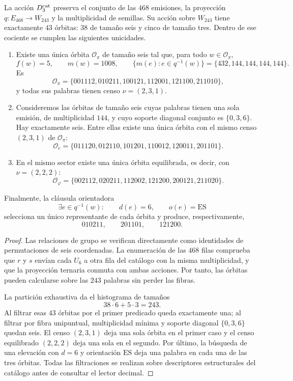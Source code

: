 \begin{theorem}
\label{thm:selector-orbital-constantes}
La acción \(D_3^{\rm cat}\) preserva el conjunto de las \(468\) emisiones,
la proyección \(q:E_{468}\to W_{243}\) y la multiplicidad de semillas. Su
acción sobre \(W_{243}\) tiene exactamente \(43\) órbitas: \(38\) de tamaño
seis y cinco de tamaño tres. Dentro de ese cociente se cumplen las siguientes
unicidades.

\begin{enumerate}
\item Existe una única órbita \(\mathcal O_\pi\) de tamaño seis tal que, para
todo \(w\in\mathcal O_\pi\),
\[
 f(w)=5,
 \qquad m(w)=1008,
 \qquad
 \{m(e):e\in q^{-1}(w)\}=\{432,144,144,144,144\}.
\]
Es
\[
\mathcal O_\pi=
\{001112,010211,100121,112001,121100,211010\},
\]
y todas sus palabras tienen censo \(\nu=(2,3,1)\).

\item Consideremos las órbitas de tamaño seis cuyas palabras tienen una sola
emisión, de multiplicidad \(144\), y cuyo soporte diagonal conjunto es
\(\{0,3,6\}\). Hay exactamente seis. Entre ellas existe una única órbita
con el mismo censo \((2,3,1)\) de \(\mathcal O_\pi\):
\[
\mathcal O_e=
\{011120,012110,101201,110012,120011,201101\}.
\]

\item En el mismo sector existe una única órbita equilibrada, es decir, con
\(\nu=(2,2,2)\):
\[
\mathcal O_\varphi=
\{002112,020211,112002,121200,200121,211020\}.
\]
\end{enumerate}

Finalmente, la cláusula orientadora
\begin{equation}
 \exists e\in q^{-1}(w):
 \qquad d(e)=6,
 \qquad o(e)=\mathrm{ES}
 \label{eq:gauge-orbital-constantes}
\end{equation}
selecciona un único representante de cada órbita y produce, respectivamente,
\[
 \boxed{010211,\qquad201101,\qquad121200.}
\]
\end{theorem}

\begin{proof}
Las relaciones de grupo se verifican directamente como identidades de
permutaciones de seis coordenadas. La enumeración de las \(468\) filas
comprueba que \(r\) y \(s\) envían cada \(U_6\) a otra fila del catálogo con
la misma multiplicidad, y que la proyección ternaria conmuta con ambas
acciones. Por tanto, las órbitas pueden calcularse sobre las \(243\) palabras
sin perder las fibras.

La partición exhaustiva da el histograma de tamaños
\[
 38\cdot6+5\cdot3=243.
\]
Al filtrar esas \(43\) órbitas por el primer predicado queda exactamente una;
al filtrar por fibra unipuntual, multiplicidad mínima y soporte diagonal
\(\{0,3,6\}\) quedan seis. El censo \((2,3,1)\) deja una sola órbita en el
primer caso y el censo equilibrado \((2,2,2)\) deja una sola en el segundo.
Por último, la búsqueda de una elevación con \(d=6\) y orientación
\(\mathrm{ES}\) deja una palabra en cada una de las tres órbitas. Todas las
filtraciones se realizan sobre descriptores estructurales del catálogo antes de consultar el
lector decimal.
\end{proof}

